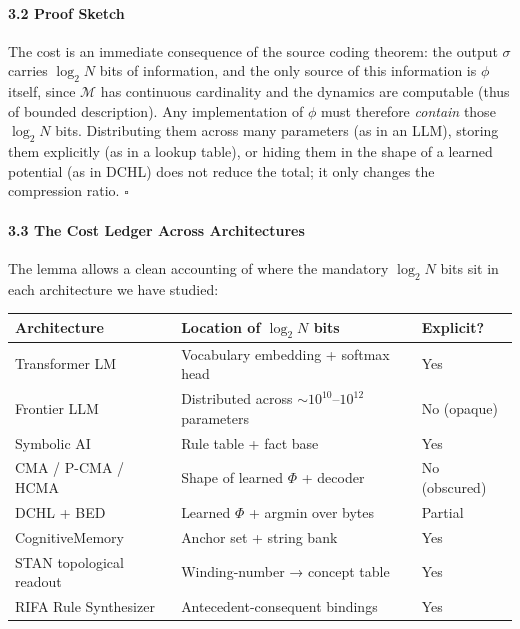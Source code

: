 \documentclass[
  11pt,
  a4paper,
]{article}
\begin{document}
\paragraph{3.2 Proof Sketch}\label{proof-sketch}

The cost is an immediate consequence of the source coding theorem: the
output \(\sigma\) carries \(\log_2 N\) bits of information, and the only
source of this information is \(\phi\) itself, since \(\mathcal{M}\) has
continuous cardinality and the dynamics are computable (thus of bounded
description). Any implementation of \(\phi\) must therefore
\emph{contain} those \(\log_2 N\) bits. Distributing them across many
parameters (as in an LLM), storing them explicitly (as in a lookup
table), or hiding them in the shape of a learned potential (as in DCHL)
does not reduce the total; it only changes the compression ratio.
\(\square\)

\paragraph{3.3 The Cost Ledger Across
Architectures}\label{the-cost-ledger-across-architectures}

The lemma allows a clean accounting of where the mandatory \(\log_2 N\)
bits sit in each architecture we have studied:

\begin{longtable}[]{@{}
  >{\raggedright\arraybackslash}p{}
  >{\raggedright\arraybackslash}p{}
  >{\raggedright\arraybackslash}p{}@{}}
\toprule\noalign{}
\begin{minipage}[b]{\linewidth}\raggedright
Architecture
\end{minipage} & \begin{minipage}[b]{\linewidth}\raggedright
Location of \(\log_2 N\) bits
\end{minipage} & \begin{minipage}[b]{\linewidth}\raggedright
Explicit?
\end{minipage} \\
\midrule\noalign{}
\endhead
\bottomrule\noalign{}
\endlastfoot
Transformer LM & Vocabulary embedding + softmax head & Yes \\
Frontier LLM & Distributed across \(\sim 10^{10}\)--\(10^{12}\)
parameters & No (opaque) \\
Symbolic AI & Rule table + fact base & Yes \\
CMA / P-CMA / HCMA & Shape of learned \(\Phi\) + decoder & No
(obscured) \\
DCHL + BED & Learned \(\Phi\) + argmin over bytes & Partial \\
CognitiveMemory & Anchor set + string bank & Yes \\
STAN topological readout & Winding-number → concept table & Yes \\
RIFA Rule Synthesizer & Antecedent-consequent bindings & Yes \\
\end{longtable}
\end{document}
